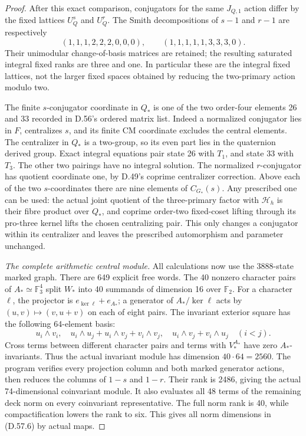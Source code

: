 \begin{proof}
After this exact comparison, conjugators for the same
\(J_{Q,1}\) action differ by the fixed lattices
\(U_Q^s\) and \(U_Q^r\). The Smith decompositions of
\(s-1\) and \(r-1\) are respectively
\[
 (1,1,1,2,2,2,0,0,0),\qquad
 (1,1,1,1,1,3,3,3,0).
 \tag{D.57.21}
\]
Their unimodular change-of-basis matrices are retained;
the resulting saturated integral fixed ranks are three
and one. In particular these are the integral fixed
lattices, not the larger fixed spaces obtained by
reducing the two-primary action modulo two.

The finite \(s\)-conjugator coordinate in \(Q_*\) is
one of the two order-four elements 26 and 33 recorded
in D.56's ordered matrix list. Indeed a normalized
conjugator lies in \(F\), centralizes \(s\), and its
finite CM coordinate excludes the central elements.
The centralizer in \(Q_*\) is a two-group, so its even
part lies in the quaternion derived group. Exact
integral equations pair state 26 with \(T_1\), and
state 33 with \(T_3\). The other two pairings have
no integral solution. The normalized \(r\)-conjugator
has quotient coordinate one, by D.49's coprime
centralizer correction. Above each of the two
\(s\)-coordinates there are nine elements of
\(C_{G_*}(s)\). Any prescribed one can be used:
the actual joint quotient of the three-primary factor
with \(\mathcal H_h\) is their fibre product over
\(Q_*\), and coprime order-two fixed-coset lifting
through its pro-three kernel lifts the chosen
centralizing pair. This only changes a conjugator
within its centralizer and leaves the prescribed
automorphism and parameter unchanged.

\emph{The complete arithmetic central module.}
All calculations now use the 3888-state marked graph.
There are 649 explicit free words. The 40 nonzero
character pairs of \(A_*\simeq\mathbb F_3^4\) split
\(W_*\) into 40 summands of dimension 16 over
\(\mathbb F_2\). For a character \(\ell\), the
projector is \(e_{\ker\ell}+e_{A_*}\); a generator
of \(A_*/\ker\ell\) acts by
\((u,v)\mapsto(v,u+v)\) on each of eight pairs.
The invariant exterior square has the following
64-element basis:
\[
 u_i\wedge v_i,\quad
 u_i\wedge u_j+u_i\wedge v_j+v_i\wedge v_j,\quad
 u_i\wedge v_j+v_i\wedge u_j\quad(i<j).
 \tag{D.57.22}
\]
Cross terms between different character pairs and
terms with \(V_*^{A_*}\) have zero \(A_*\)-invariants.
Thus the actual invariant module has dimension
\(40\cdot64=2560\). The program verifies every
projection column and both marked generator actions,
then reduces the columns of \(1-s\) and \(1-r\).
Their rank is 2486, giving the actual 74-dimensional
coinvariant module. It also evaluates all 48 terms
of the remaining deck norm on every coinvariant
representative. The full norm rank is 40, while
compactification lowers the rank to six. This gives
all norm dimensions in (D.57.6) by actual maps.


\end{proof}
